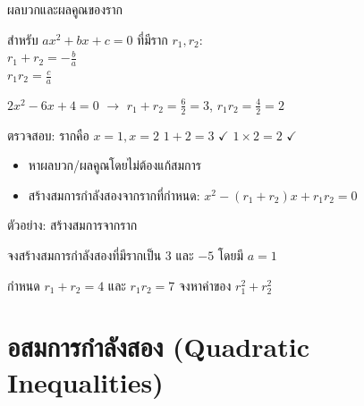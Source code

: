 \documentclass[11pt, aspectratio=169]{beamer}
\begin{document}
\begin{frame}{ผลบวกและผลคูณของราก}
  \begin{explanation}
    สำหรับ $ax^2 + bx + c = 0$ ที่มีราก $r_1, r_2$: \\
    $r_1 + r_2 = -\frac{b}{a}$ \\
    $r_1 r_2 = \frac{c}{a}$ 
  \end{explanation}

  \begin{exambox}[ตัวอย่าง]
    $2x^2 - 6x + 4 = 0$ \quad $\rightarrow$ \quad $r_1 + r_2 = \frac{6}{2} = 3$,
    \; $r_1 r_2 = \frac{4}{2} = 2$

    ตรวจสอบ: รากคือ $x=1, x=2$ \quad $1+2=3$ $\checkmark$ \quad $1\times2=2$ $\checkmark$
  \end{exambox}

  \begin{intuition}
    \begin{itemize}
      \item หาผลบวก/ผลคูณโดยไม่ต้องแก้สมการ
      \item สร้างสมการกำลังสองจากรากที่กำหนด:
      $x^2 - (r_1+r_2)x + r_1r_2 = 0$
    \end{itemize}
  \end{intuition}
\end{frame}

\begin{frame}[t]{ตัวอย่าง: สร้างสมการจากราก}
  \begin{exambox}[โจทย์ 1]
    จงสร้างสมการกำลังสองที่มีรากเป็น $3$ และ $-5$ โดยมี $a=1$
  \end{exambox}

  \vspace{\fill}

  \begin{exambox}[โจทย์ 2]
    กำหนด $r_1 + r_2 = 4$ และ $r_1 r_2 = 7$ จงหาค่าของ $r_1^2 + r_2^2$
  \end{exambox}

  \vspace{\fill}
\end{frame}

\section{อสมการกำลังสอง (Quadratic Inequalities)}
\end{document}
